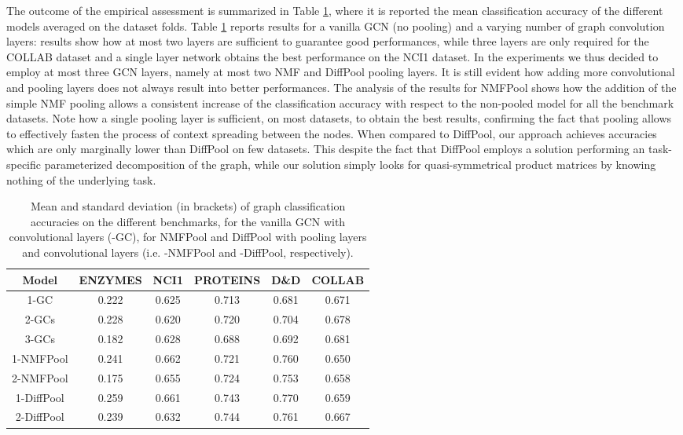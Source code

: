 \documentclass[runningheads]{llncs}
\begin{document}
The outcome of the empirical assessment is summarized in Table \ref{table-acc}, where it is reported the mean classification accuracy of the different models averaged on the dataset folds. Table \ref{table-acc} reports results for a vanilla GCN (no pooling) and a varying number of graph convolution layers: results show how at most two layers are sufficient to guarantee good performances, while three layers are only required for the COLLAB dataset and a single layer network obtains the best performance on the NCI1 dataset. In the experiments we thus decided to employ at most three GCN layers, namely at most two NMF and DiffPool pooling layers. It is still evident how adding more convolutional and pooling layers does not always result into better performances. The analysis of the results for NMFPool shows how the addition of the simple NMF pooling allows a consistent increase of the classification accuracy with respect to the non-pooled model for all the benchmark datasets. Note how a single pooling layer is sufficient, on most datasets, to obtain the best results, confirming the fact that pooling allows to effectively fasten the process of context spreading between the nodes. When compared to DiffPool, our approach achieves accuracies which are only marginally lower than DiffPool on few datasets. This despite the fact that DiffPool employs a solution performing an task-specific parameterized decomposition of the graph, while our solution simply looks for quasi-symmetrical product matrices by knowing nothing of the underlying task.
\begin{table}
\caption{Mean and standard deviation (in brackets) of graph classification accuracies on the different benchmarks, for the vanilla GCN with  convolutional layers (-GC), for NMFPool and DiffPool with  pooling layers and  convolutional layers (i.e. -NMFPool and -DiffPool, respectively).}\label{table-acc}
\begin{tabular}{cccccc} \toprule[1.5pt]
    {\bfseries{Model}} & {\bfseries{ENZYMES}} & {\bfseries{NCI1}} & {\bfseries{PROTEINS}} & {\bfseries{D\&D}} & {\bfseries{COLLAB}} \\ \midrule
    {1-GC} &  0.222 & 0.625  & 0.713  & 0.681  & 0.671  \\
    {2-GCs}  & 0.228   & 0.620  & 0.720  & 0.704  & 0.678    \\
    {3-GCs}  & 0.182  & 0.628  & 0.688   & 0.692  & 0.681  \\ \midrule
    {1-NMFPool}  & 0.241    & 0.662   & 0.721   & 0.760  & 0.650  \\
    {2-NMFPool}  & 0.175   & 0.655  & 0.724   & 0.753  & 0.658   \\ \midrule
    {1-DiffPool}  & 0.259    & 0.661   & 0.743  & 0.770  & 0.659  \\
    {2-DiffPool} & 0.239    & 0.632  & 0.744    & 0.761  & 0.667   \\ \bottomrule[1.5pt]
\end{tabular}
\end{table}
\end{document}
